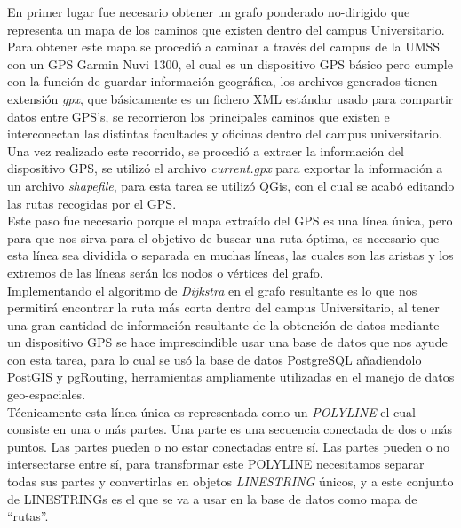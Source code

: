  En primer lugar fue necesario obtener un grafo ponderado no-dirigido que representa un mapa de los caminos que existen dentro del campus Universitario.\\

 Para obtener este mapa se procedió a caminar a través del campus de la UMSS con un GPS Garmin Nuvi 1300, el cual es un dispositivo GPS básico pero cumple con la función de guardar información geográfica, los archivos generados tienen extensión \emph{gpx}, que básicamente es un fichero XML estándar usado para compartir datos entre GPS's, se recorrieron los principales caminos que existen e interconectan las distintas facultades y oficinas dentro del campus universitario. Una vez realizado este recorrido, se procedió a extraer la información del dispositivo GPS, se utilizó el archivo \emph{current.gpx} para exportar la información  a un archivo \emph{shapefile}, para esta tarea se utilizó QGis, con el cual se acabó editando las rutas recogidas por el GPS.\\


 Este paso fue necesario porque el mapa extraído del GPS es una línea única, pero para que nos sirva para el objetivo de buscar una ruta óptima, es necesario que esta línea sea dividida o separada en muchas líneas, las cuales son las aristas y los extremos de las líneas serán los nodos o vértices del grafo.\\

 Implementando el algoritmo de \emph{Dijkstra} en el grafo resultante es lo que nos permitir\'a encontrar la ruta más corta dentro del campus Universitario, al tener una gran cantidad de información resultante de la obtención de datos mediante un dispositivo GPS se hace imprescindible usar una base de datos que nos ayude con esta tarea, para lo cual se usó la base de datos PostgreSQL añadiendolo PostGIS y pgRouting, herramientas ampliamente utilizadas en el manejo de datos geo-espaciales.\\



 Técnicamente esta línea única es representada como un \emph{POLYLINE} el cual consiste en una o más partes. Una parte es una secuencia conectada de dos o más puntos. Las partes pueden o no estar conectadas entre sí. Las partes pueden o no intersectarse entre sí, para transformar este POLYLINE necesitamos separar todas sus partes y convertirlas en objetos \emph{LINESTRING} únicos, y a este conjunto de LINESTRINGs es el que se va a usar en la base de datos como mapa de ``rutas''.\cite{esri_shapefile}\\

